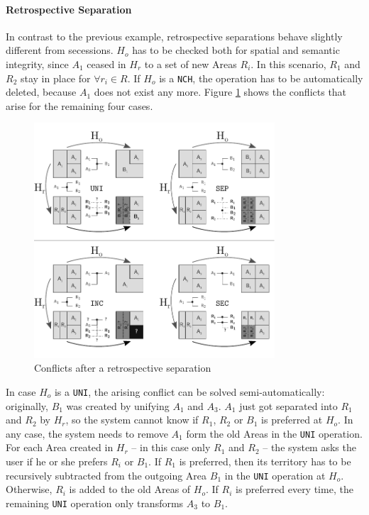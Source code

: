 \paragraph{Retrospective Separation} %
\label{par:retrospective_separation}

In contrast to the previous example, retrospective separations behave slightly different from secessions. $H_o$ has to be checked both for spatial and semantic integrity, since $A_1$ ceased in $H_r$ to a set of new Areas $R_i$. In this scenario, $R_1$ and $R_2$ stay in place for $\forall r_i \in R$. If $H_o$ is a \texttt{NCH}, the operation has to be automatically deleted, because $A_1$ does not exist any more. Figure \ref{fig:update_conflict_SEP} shows the conflicts that arise for the remaining four cases.

\begin{figure}[ht]
\vspace{1em}
  \centering
  \includegraphics[width=0.8\textwidth]{graphics/development/editing_hivent_data/retrospective_updates/SEP}
  \caption{Conflicts after a retrospective separation}
  \label{fig:update_conflict_SEP}
\end{figure}

In case $H_o$ is a \texttt{UNI}, the arising conflict can be solved semi-automatically: originally, $B_1$ was created by unifying $A_1$ and $A_3$. $A_1$ just got separated into $R_1$ and $R_2$ by $H_r$, so the system cannot know if $R_1$, $R_2$ or $B_1$ is preferred at $H_o$. In any case, the system needs to remove $A_1$ form the old Areas in the \texttt{UNI} operation. For each Area created in $H_r$ -- in this case only $R_1$ and $R_2$ -- the system asks the user if he or she prefers $R_i$ or $B_1$. If $R_1$ is preferred, then its territory has to be recursively subtracted from the outgoing Area $B_1$ in the \texttt{UNI} operation at $H_o$. Otherwise, $R_i$ is added to the old Areas of $H_o$. If $R_i$ is preferred every time, the remaining \texttt{UNI} operation only transforms $A_3$ to $B_1$.


